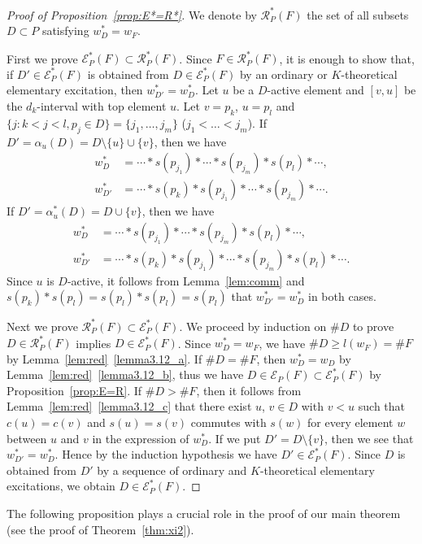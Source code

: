 \documentclass[10pt]{amsart}
\theoremstyle{definition}
\theoremstyle{remark}
\newcommand\EE{\mathcal{E}}
\newcommand\RR{\mathcal{R}}
\begin{document}
\begin{proof}[Proof of Proposition~\ref{prop:E*=R*}]
We denote by $\RR^*_P(F)$ the set of all subsets $D \subset P$ satisfying $w^*_D = w_F$.

First we prove $\EE^*_P(F) \subset \RR^*_P(F)$.
Since $F \in \RR^*_P(F)$, it is enough to show that, 
if $D' \in \EE^*_P(F)$ is obtained from $D \in \EE^*_P(F)$ by an ordinary or $K$-theoretical elementary excitation, 
then $w^*_{D'} = w^*_D$.
Let $u$ be a $D$-active element and $[v,u]$ be the $d_k$-interval with top element $u$.
Let $v = p_k$, $u = p_l$ and $\{ j : k < j < l, p_j \in D \} = \{ j_1, \dots, j_m \}$ ($j_1 < \dots < j_m$).
If $D' = \alpha_u(D) = D \setminus \{ u \} \cup \{ v \}$, then we have
\begin{align*}
w^*_D &= \cdots * s(p_{j_1}) * \cdots * s(p_{j_m}) * s(p_l) * \cdots,
\\
w^*_{D'} &= \cdots * s(p_k) * s(p_{j_1}) * \cdots * s(p_{j_m}) * \cdots.
\end{align*}
If $D' = \alpha^*_u(D) = D \cup \{ v \}$, then we have
\begin{align*}
w^*_D &= \cdots * s(p_{j_1}) * \cdots * s(p_{j_m}) * s(p_l) * \cdots,
\\
w^*_{D'} &= \cdots * s(p_k) * s(p_{j_1}) * \cdots * s(p_{j_m}) * s(p_l) * \cdots.
\end{align*}
Since $u$ is $D$-active, it follows from Lemma~\ref{lem:comm} and $s(p_k)*s(p_l) = s(p_l)*s(p_l) = s(p_l)$ 
that $w^*_{D'} = w^*_D$ in both cases.

Next we prove $\RR^*_P(F) \subset \EE^*_P(F)$.
We proceed by induction on $\# D$ to prove $D \in \RR^*_P(F)$ implies $D \in \EE^*_P(F)$.
Since $w^*_D = w_F$, we have $\# D \ge l(w_F) = \# F$ by Lemma~\ref{lem:red}~\ref{lemma3.12_a}.
If $\# D = \# F$, then $w^*_D = w_D$ by Lemma~\ref{lem:red}~\ref{lemma3.12_b}, 
thus we have $D \in \EE_P(F) \subset \EE^*_P(F)$ by Proposition~\ref{prop:E=R}.
If $\# D > \# F$, then it follows from Lemma~\ref{lem:red}~\ref{lemma3.12_c} that 
there exist $u$, $v \in D$ with $v < u$ such that $c(u) = c(v)$ and 
$s(u) = s(v)$ commutes with $s(w)$ for
every element $w$ between $u$ and $v$ in the expression of $w^*_D$.
If we put $D' = D \setminus \{ v \}$, then we see that $w^*_{D'} = w^*_D$.
Hence by the induction hypothesis we have $D' \in \EE^*_P(F)$.
Since $D$ is obtained from $D'$ by a sequence of ordinary and $K$-theoretical elementary excitations, 
we obtain $D \in \EE^*_P(F)$.
\end{proof}

The following proposition plays a crucial role in the proof of our main theorem 
(see the proof of Theorem~\ref{thm:xi2}).
\end{document}
